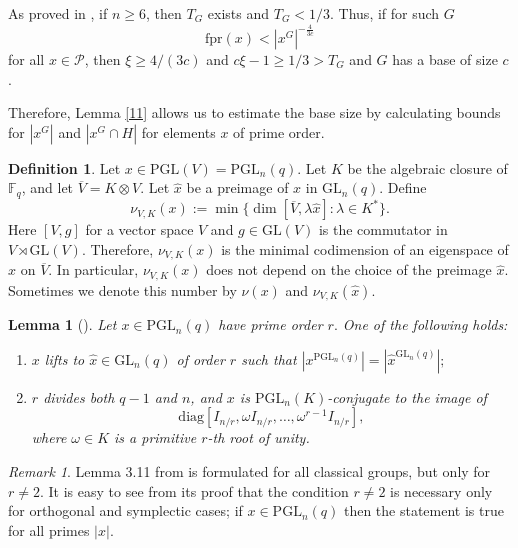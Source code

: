 \documentclass[a4paper,reqno,11pt]{amsart}
\newtheorem{Lem}[Th]{Lemma}
\theoremstyle{definition}
\newtheorem{Def}[Th]{Definition}
\theoremstyle{remark}
\newtheorem{Rem}[Th]{Remark}
\numberwithin{equation}{section}
\newcommand{\fpr}{{\mathrm{fpr}}}
\newcommand{\diag}{\mathrm{diag}}
\newcommand{\GL}{{\mathrm{GL}}}
\newcommand{\PGL}{{\mathrm{PGL}}}
\begin{document}
As proved in \cite[Proposition 2.2]{burness},  if  $n \ge 6$, then $T_G$ exists and $T_G<1/3$. 
Thus, if for such $G$  
\begin{equation}\label{0} 
\fpr(x)<|x^G|^{-\frac{4}{3c}}
\end{equation}
 for all $x \in \mathscr{P} $, then $\xi \ge {4}/{(3c)}$ and $c\xi -1 \ge 1/3 >T_G$ and $G$ has a base of size $c$.

Therefore, Lemma \ref{11} allows us to estimate the base size by calculating bounds for $|x^G|$ and $|x^G \cap H|$ for elements $x$ of prime order. 





\begin{Def}
\label{nudef}
Let $x \in \PGL(V)=\PGL_n(q)$. Let $K$ be the algebraic closure of $\mathbb{F}_q$, and let $\overline{V}=K \otimes V.$ Let $\hat{x}$ be a preimage of $x$ in $\GL_n(q).$ Define
$$ \nu_{V, K}(x):= \min\{\dim [\overline{V}, \lambda \hat{x}] : \lambda \in K^* \}. $$ Here $[V,g]$ for a vector space $V$ and $g \in \GL(V)$ is the commutator in $V \rtimes \GL(V)$.  Therefore, $\nu_{V, K}(x)$ is  the minimal codimension of an eigenspace of $\hat{x}$  on $\overline{V}$. In particular, $\nu_{V, K}(x)$ does not depend on the choice of the preimage $\hat{x}.$  Sometimes we denote this number by $\nu(x)$ and $\nu_{V, K}(\hat{x})$. 
\end{Def}

\begin{Lem}[{\cite[Lemma 3.11]{fpr2}}]\label{prost}  %
Let $x \in \PGL_n(q)$ have  prime order $r.$ One of the following holds: 
\begin{enumerate}[font=\normalfont]
\item $x$ lifts to  $\hat{x} \in \GL_n(q)$ of order $r$ such that $|x^{\PGL_n(q)}|=|\hat{x}^{\GL_n(q)}|;$ \label{prost1}
\item $r$ divides both $q-1$ and $n$, and $x$ is $\PGL_n(K)$-conjugate to the image of $$\diag[I_{n/r}, \omega I_{n/r}, \ldots , \omega^{r-1} I_{n/r} ],$$ where $\omega \in K$ is a primitive $r$-th root of unity. \label{prost2}
\end{enumerate} 
\end{Lem}

\begin{Rem}
Lemma 3.11 from \cite{fpr2} is formulated for   all classical groups, but only for $r \ne 2$. It is easy to see  from its proof  that the condition $r\ne 2$ is necessary only for orthogonal and symplectic cases; if $x \in \PGL_n(q)$ then the statement is true for all primes $|x|.$  
\end{Rem}
\end{document}
